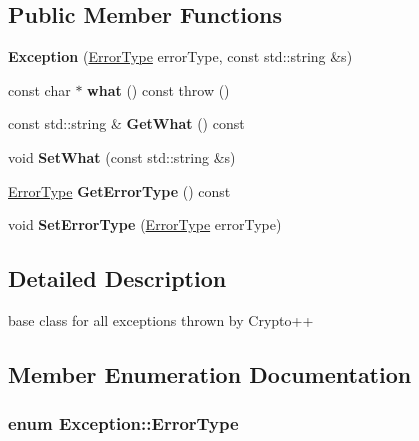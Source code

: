 \subsection*{Public Member Functions}
\begin{DoxyCompactItemize}
\item 
\hypertarget{class_exception_a30847048a4b7c9a7aae5e6178964dcfb}{
{\bfseries Exception} (\hyperlink{class_exception_a8e53909d979479380e0274807c074c0a}{ErrorType} errorType, const std::string \&s)}
\label{class_exception_a30847048a4b7c9a7aae5e6178964dcfb}

\item 
\hypertarget{class_exception_a45642915395d3b813fedc2593fbcb8bb}{
const char $\ast$ {\bfseries what} () const   throw ()}
\label{class_exception_a45642915395d3b813fedc2593fbcb8bb}

\item 
\hypertarget{class_exception_ad67873a3923892d08072bdd378b24b29}{
const std::string \& {\bfseries GetWhat} () const }
\label{class_exception_ad67873a3923892d08072bdd378b24b29}

\item 
\hypertarget{class_exception_a15f2ad1081dbac6d3cd676a4baa9515d}{
void {\bfseries SetWhat} (const std::string \&s)}
\label{class_exception_a15f2ad1081dbac6d3cd676a4baa9515d}

\item 
\hypertarget{class_exception_aeb3ea0f59ff8e38ef47fe0d9c5c22dc3}{
\hyperlink{class_exception_a8e53909d979479380e0274807c074c0a}{ErrorType} {\bfseries GetErrorType} () const }
\label{class_exception_aeb3ea0f59ff8e38ef47fe0d9c5c22dc3}

\item 
\hypertarget{class_exception_a0e1d8806d64e54e9584e9918462894bc}{
void {\bfseries SetErrorType} (\hyperlink{class_exception_a8e53909d979479380e0274807c074c0a}{ErrorType} errorType)}
\label{class_exception_a0e1d8806d64e54e9584e9918462894bc}

\end{DoxyCompactItemize}


\subsection{Detailed Description}
base class for all exceptions thrown by Crypto++ 

\subsection{Member Enumeration Documentation}
\hypertarget{class_exception_a8e53909d979479380e0274807c074c0a}{
\subsubsection[{ErrorType}]{\setlength{\rightskip}{0pt plus 5cm}enum {\bf Exception::ErrorType}}}
\label{class_exception_a8e53909d979479380e0274807c074c0a}


